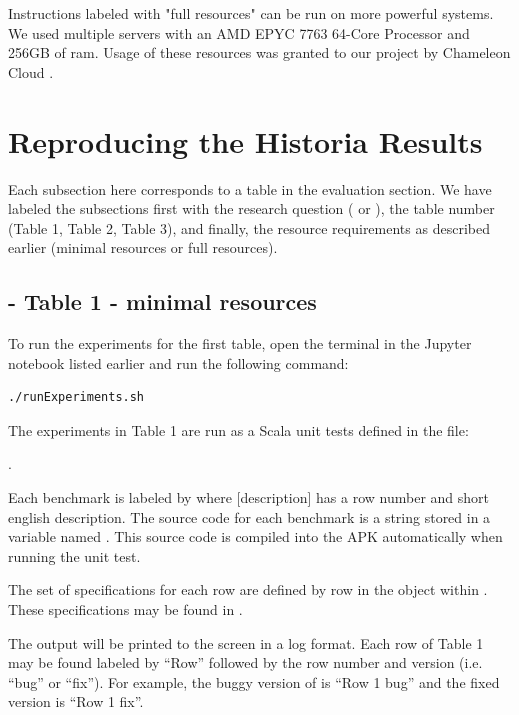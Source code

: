 \documentclass{acmart} %
\begin{document}
Instructions labeled with "full resources" can be run on more powerful systems.  We used multiple servers with an AMD EPYC 7763 64-Core Processor and 256GB of ram.  Usage of these resources was granted to our project by Chameleon Cloud \cite{keahey2020lessons}.


\section{Reproducing the Historia Results}

Each subsection here corresponds to a table in the evaluation section.  We have labeled the subsections first with the research question ( or ), the table number (Table 1, Table 2, Table 3), and finally, the resource requirements as described earlier (minimal resources or full resources).

\subsection{ - Table 1 - minimal resources}

To run the experiments for the first table, open the terminal in the Jupyter notebook listed earlier and run the following command:
\begin{lstlisting}[language=bash]
    ./runExperiments.sh
\end{lstlisting}

The experiments in Table 1 are run as a Scala unit tests defined in the file: 

.  

Each benchmark is labeled by  where [description] has a row number and short english description.
The source code for each benchmark is a string stored in a variable named .
This source code is compiled into the APK automatically when running the unit test.

The set of \newls specifications for each row are defined by row in the  object within .  These specifications may be found in .

The output will be printed to the screen in a log format.  Each row of Table 1 may be found labeled by ``Row'' followed by the row number and version (i.e. ``bug'' or ``fix'').  For example, the buggy version of \apGa is ``Row 1 bug'' and the fixed version is ``Row 1 fix''.  
\end{document}
